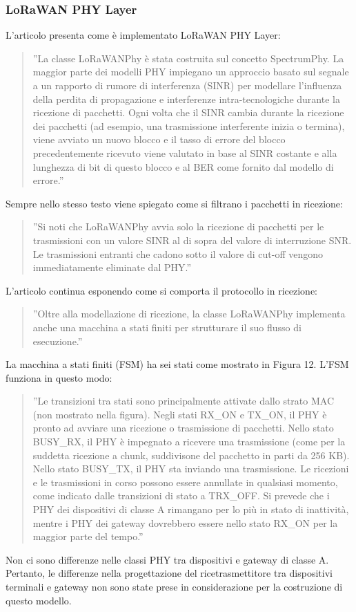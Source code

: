 \documentclass[a4paper]{report} %
\begin{document}
\subsubsection{LoRaWAN PHY Layer}
L'articolo \cite{art:rif.49} presenta come è implementato LoRaWAN PHY Layer:
\begin{quote}
	''La classe LoRaWANPhy è stata costruita sul concetto SpectrumPhy. La maggior parte dei modelli PHY impiegano un approccio basato sul segnale a un rapporto di rumore di interferenza (SINR) per modellare l'influenza della perdita di propagazione e interferenze intra-tecnologiche durante la ricezione di pacchetti. Ogni volta che il SINR cambia durante la ricezione dei pacchetti (ad esempio, una trasmissione interferente inizia o termina), viene avviato un nuovo blocco e il tasso di errore del blocco precedentemente ricevuto viene valutato in base al SINR costante e alla lunghezza di bit di questo blocco e al BER come fornito dal modello di errore.''
\end{quote}
Sempre nello stesso testo viene spiegato come si filtrano i pacchetti in ricezione:
\begin{quote}
	''Si noti che LoRaWANPhy avvia solo la ricezione di pacchetti per le trasmissioni con un valore SINR al di sopra del valore di interruzione SNR. Le trasmissioni entranti che cadono sotto il valore di cut-off vengono immediatamente eliminate dal PHY.''
\end{quote}
L'articolo continua esponendo come si comporta il protocollo in ricezione:
\begin{quote}
	''Oltre alla modellazione di ricezione, la classe LoRaWANPhy implementa anche una macchina a stati finiti per strutturare il suo flusso di esecuzione.'' 
\end{quote}
La macchina a stati finiti (FSM) ha sei stati come mostrato in Figura 12. L'FSM funziona in questo modo:
\begin{quote}
	''Le transizioni tra stati sono principalmente attivate dallo strato MAC (non mostrato nella figura). Negli stati RX\_ON e TX\_ON, il PHY è pronto ad avviare una ricezione o trasmissione di pacchetti. Nello stato BUSY\_RX, il PHY è impegnato a ricevere una trasmissione (come per la suddetta ricezione a chunk, suddivisone del pacchetto in parti da 256 KB). Nello stato BUSY\_TX, il PHY sta inviando una trasmissione. Le ricezioni e le trasmissioni in corso possono essere annullate in qualsiasi momento, come indicato dalle transizioni di stato a TRX\_OFF. Si prevede che i PHY dei dispositivi di classe A rimangano per lo più in stato di inattività, mentre i PHY dei gateway dovrebbero essere nello stato RX\_ON per la maggior parte del tempo.''
\end{quote}
Non ci sono differenze nelle classi PHY tra dispositivi e gateway di classe A. Pertanto, le differenze nella progettazione del ricetrasmettitore tra dispositivi terminali e gateway non sono state prese in considerazione per la costruzione di questo modello.
\end{document}
